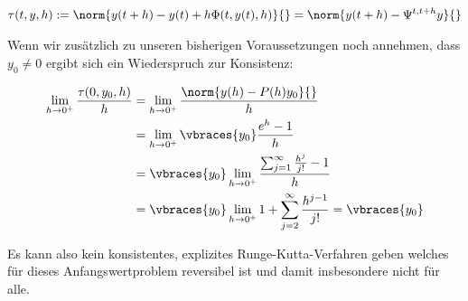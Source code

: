 \begin{solution}
  \begin{align*}
    \tau(t,y,h) := \norm{y(t+h)-y(t)+h\Phi(t,y(t),h)}{} =
    \norm{y(t+h)- \Psi^{t,t+h}y}{}
  \end{align*}

  Wenn wir zusätzlich zu unseren bisherigen Voraussetzungen noch annehmen, dass
  $y_0 \neq 0$ ergibt sich ein Wiederspruch zur Konsistenz:

  \begin{align*}
    \lim_{h\rightarrow 0^+} \frac{\tau(0,y_0,h)}{h}
    &=\lim_{h\rightarrow 0^+} \frac{\norm{y(h)-P(h)y_0}{}}{h} \\
    &=\lim_{h\rightarrow 0^+} \vbraces{y_0}\frac{e^h-1}{h} \\
    &= \vbraces{y_0} \lim_{h\rightarrow 0^+}
    \frac{\sum_{j=1}^\infty \frac{h^j}{j!}-1}{h} \\
    &= \vbraces{y_0} \lim_{h\rightarrow 0^+}
    1 + \sum_{j=2}^\infty \frac{h^{j-1}}{j!} = \vbraces{y_0}
  \end{align*}

  Es kann also kein konsistentes, explizites Runge-Kutta-Verfahren geben welches
  für dieses Anfangswertproblem reversibel ist und damit insbesondere nicht für alle.
\end{solution}

